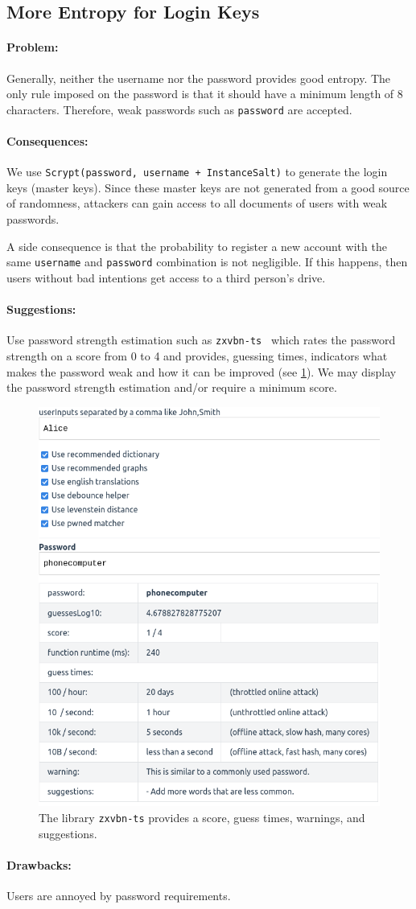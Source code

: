 \subsection{More Entropy for Login Keys}

\paragraph{Problem:}
Generally, neither the username nor the password provides good entropy.
The only rule imposed on the password is that it should have a minimum length of 8 characters.
Therefore, weak passwords such as \texttt{password} are accepted.

\paragraph{Consequences:}
We use \texttt{Scrypt(password, username + InstanceSalt)} to generate the login keys (master keys).
Since these master keys are not generated from a good source of randomness, attackers can gain access to all documents of users with weak passwords.

A side consequence is that the probability to register a new account with the same \texttt{username} and \texttt{password} combination is not negligible. If this happens, then users without bad intentions get access to a third person's drive.

\paragraph{Suggestions:}
Use password strength estimation such as \texttt{zxvbn-ts}~\cite{Wheeler2016,MrWook2022} which rates the password strength on a score from 0 to 4 and provides, guessing times, indicators what makes the password weak and how it can be improved (see \cref{fig:zxvbn}).
We may display the password strength estimation and/or require a minimum score.


\begin{figure}[t]
  \centering
  \includegraphics[width=0.55\columnwidth]{images/zxvbn.png}
  \caption{The library \texttt{zxvbn-ts} provides a score, guess times, warnings, and suggestions.}
  \label{fig:zxvbn}
\end{figure}

\paragraph{Drawbacks:} Users are annoyed by password requirements.
